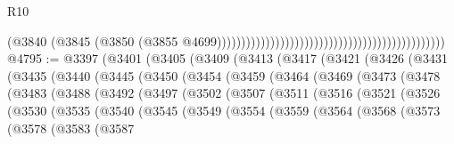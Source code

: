 \begin{lexlean}{R10}
\begin{coremodule}
                                                                                          (@3840
                                                                                            (@3845
                                                                                              (@3850
                                                                                                (@3855
                                                                                                  @4699)))))))))))))))))))))))))))))))))))))))))))))))
@4795 := @3397
    (@3401
      (@3405
        (@3409
          (@3413
            (@3417
              (@3421
                (@3426
                  (@3431
                    (@3435
                      (@3440
                        (@3445
                          (@3450
                            (@3454
                              (@3459
                                (@3464
                                  (@3469
                                    (@3473
                                      (@3478
                                        (@3483
                                          (@3488
                                            (@3492
                                              (@3497
                                                (@3502
                                                  (@3507
                                                    (@3511
                                                      (@3516
                                                        (@3521
                                                          (@3526
                                                            (@3530
                                                              (@3535
                                                                (@3540
                                                                  (@3545
                                                                    (@3549
                                                                      (@3554
                                                                        (@3559
                                                                          (@3564
                                                                            (@3568
                                                                              (@3573
                                                                                (@3578
                                                                                  (@3583
                                                                                    (@3587

\end{coremodule}
\end{lexlean}
